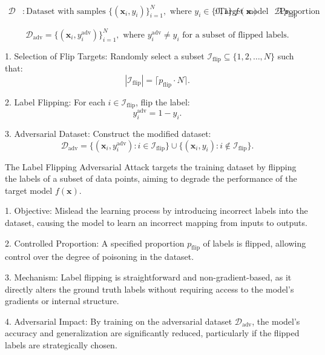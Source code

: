\[
\begin{aligned}
\mathcal{D} & : \text{Dataset with samples } \{(\mathbf{x}_i, y_i)\}_{i=1}^N, \text{ where } y_i \in \{0, 1\}.
f(\mathbf{x}) & : \text{Target model to be trained on } \mathcal{D}.
p_{\text{flip}} & : \text{Proportion of labels to be flipped in the dataset.}
\end{aligned}
\]


\[
\mathcal{D}_{\text{adv}} = \{(\mathbf{x}_i, y_i^{\text{adv}})\}_{i=1}^N, \text{ where } y_i^{\text{adv}} \neq y_i \text{ for a subset of flipped labels}.
\]

1. Selection of Flip Targets:  
   Randomly select a subset $\mathcal{I}_{\text{flip}} \subseteq \{1, 2, \ldots, N\}$ such that:
   \[
   |\mathcal{I}_{\text{flip}}| = \lceil p_{\text{flip}} \cdot N \rceil.
   \]

2. Label Flipping:  
   For each $i \in \mathcal{I}_{\text{flip}}$, flip the label:
   \[
   y_i^{\text{adv}} = 1 - y_i.
   \]

3. Adversarial Dataset:  
   Construct the modified dataset:
   \[
   \mathcal{D}_{\text{adv}} = \{(\mathbf{x}_i, y_i^{\text{adv}}) : i \in \mathcal{I}_{\text{flip}}\} \cup \{(\mathbf{x}_i, y_i) : i \notin \mathcal{I}_{\text{flip}}\}.
   \]

The Label Flipping Adversarial Attack targets the training dataset by flipping the labels of a subset of data points, aiming to degrade the performance of the target model $f(\mathbf{x})$. 

1. Objective: Mislead the learning process by introducing incorrect labels into the dataset, causing the model to learn an incorrect mapping from inputs to outputs.

2. Controlled Proportion: A specified proportion $p_{\text{flip}}$ of labels is flipped, allowing control over the degree of poisoning in the dataset.

3. Mechanism: Label flipping is straightforward and non-gradient-based, as it directly alters the ground truth labels without requiring access to the model's gradients or internal structure.

4. Adversarial Impact: By training on the adversarial dataset $\mathcal{D}_{\text{adv}}$, the model's accuracy and generalization are significantly reduced, particularly if the flipped labels are strategically chosen.